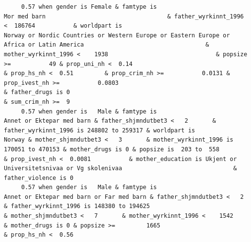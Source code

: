 \documentclass[
  letterpaper,
  DIV=11,
  numbers=noendperiod]{scrreprt}
\begin{document}
\begin{verbatim}
     0.57 when gender is Female & famtype is                                                     Mor med barn                                   & father_wyrkinnt_1996 <  186764           & worldpart is                                           Norway or Nordic Countries or Western Europe or Eastern Europe or Africa or Latin America                                   & mother_wyrkinnt_1996 <    1938                               & popsize >=           49 & prop_uni_nh <  0.14                                              & prop_hs_nh <  0.51         & prop_crim_nh >=           0.0131 & prop_ivest_nh >=           0.0803                                                                                                                          & father_drugs is 0                                                                        & sum_crim_nh >=  9
     0.57 when gender is   Male & famtype is                                        Annet or Ektepar med barn & father_shjmndutbet3 <   2       & father_wyrkinnt_1996 is 248802 to 259317 & worldpart is                                                                                                                              Norway & mother_shjmndutbet3 <   3       & mother_wyrkinnt_1996 is 170051 to 470153 & mother_drugs is 0 & popsize is  203 to  558                                                                                                                                    & prop_ivest_nh <  0.0081           & mother_education is Ukjent or Universitetsnivaa or Vg skolenivaa                                & father_violence is 0                                                                                                               
     0.57 when gender is   Male & famtype is                        Annet or Ektepar med barn or Far med barn & father_shjmndutbet3 <   2       & father_wyrkinnt_1996 is 148380 to 194625                                                                                                                                                    & mother_shjmndutbet3 <   7       & mother_wyrkinnt_1996 <    1542           & mother_drugs is 0 & popsize >=         1665                                                                    & prop_hs_nh <  0.56                                                                                                                                                                                                                                                                                                                       

\end{verbatim}
\end{document}
